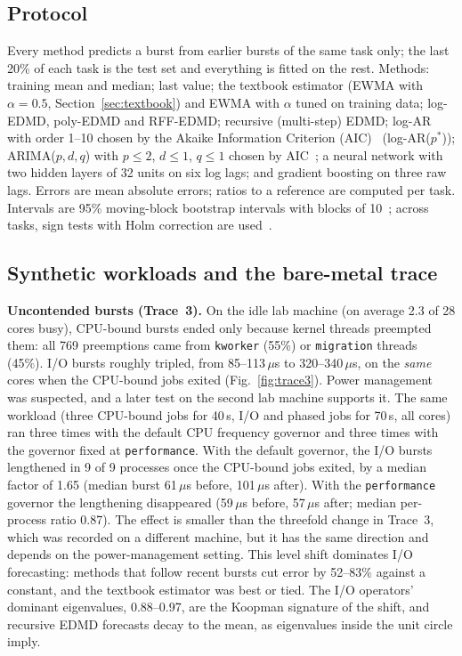 \documentclass[conference,onecolumn,11pt]{IEEEtran}
\begin{document}
\subsection{Protocol}
Every method predicts a burst from earlier bursts of the same task only; the last 20\% of each task is the test set and everything is fitted on the rest. Methods: training mean and median; last value; the textbook estimator (EWMA with $\alpha=0.5$, Section~\ref{sec:textbook}) and EWMA with $\alpha$ tuned on training data; log-EDMD, poly-EDMD and RFF-EDMD; recursive (multi-step) EDMD; log-AR with order 1--10 chosen by the Akaike Information Criterion (AIC)~\cite{akaike1974} (log-AR($p^*$)); ARIMA($p,d,q$) with $p\le2$, $d\le1$, $q\le1$ chosen by AIC~\cite{box2015}; a neural network with two hidden layers of 32 units on six log lags; and gradient boosting on three raw lags. Errors are mean absolute errors; ratios to a reference are computed per task. Intervals are 95\% moving-block bootstrap intervals with blocks of 10~\cite{kunsch1989}; across tasks, sign tests with Holm correction are used~\cite{holm1979}.

\subsection{Synthetic workloads and the bare-metal trace}
\textbf{Uncontended bursts (Trace~3).} On the idle lab machine (on average 2.3 of 28 cores busy), CPU-bound bursts ended only because kernel threads preempted them: all 769 preemptions came from \texttt{kworker} (55\%) or \texttt{migration} threads (45\%). I/O bursts roughly tripled, from 85--113\,$\mu$s to 320--340\,$\mu$s, on the \emph{same} cores when the CPU-bound jobs exited (Fig.~\ref{fig:trace3}). Power management was suspected, and a later test on the second lab machine supports it. The same workload (three CPU-bound jobs for 40\,s, I/O and phased jobs for 70\,s, all cores) ran three times with the default CPU frequency governor and three times with the governor fixed at \texttt{performance}. With the default governor, the I/O bursts lengthened in 9 of 9 processes once the CPU-bound jobs exited, by a median factor of 1.65 (median burst 61\,$\mu$s before, 101\,$\mu$s after). With the \texttt{performance} governor the lengthening disappeared (59\,$\mu$s before, 57\,$\mu$s after; median per-process ratio 0.87). The effect is smaller than the threefold change in Trace~3, which was recorded on a different machine, but it has the same direction and depends on the power-management setting. This level shift dominates I/O forecasting: methods that follow recent bursts cut error by 52--83\% against a constant, and the textbook estimator was best or tied. The I/O operators' dominant eigenvalues, 0.88--0.97, are the Koopman signature of the shift, and recursive EDMD forecasts decay to the mean, as eigenvalues inside the unit circle imply.
\end{document}
